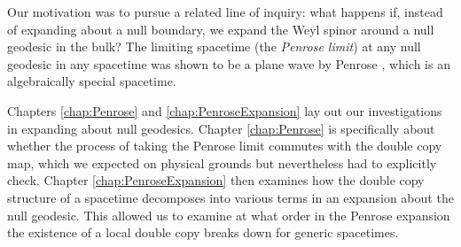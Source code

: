 Our motivation was to pursue a related line of inquiry: what happens if, instead of expanding about a null
boundary, we expand the Weyl spinor around a null
geodesic in the bulk? The limiting spacetime (the \textit{Penrose limit}) at any null geodesic in any spacetime was
shown to be a plane wave by Penrose \cite{penrose1976any}, which is an algebraically special spacetime.

Chapters \ref{chap:Penrose} and \ref{chap:PenroseExpansion} lay out our investigations in expanding about null
geodesics. Chapter \ref{chap:Penrose} is specifically about whether the process of taking the Penrose limit
commutes with the double copy map, which we expected on physical grounds but nevertheless had to explicitly check.
Chapter \ref{chap:PenroseExpansion} then examines how the double copy structure of a spacetime decomposes into
various terms in an expansion about the null geodesic. This allowed us to examine at what order in the Penrose
expansion the existence of a local double copy breaks down for generic spacetimes.

\nobibintoc
\printbibliography[heading=subbibliography]
